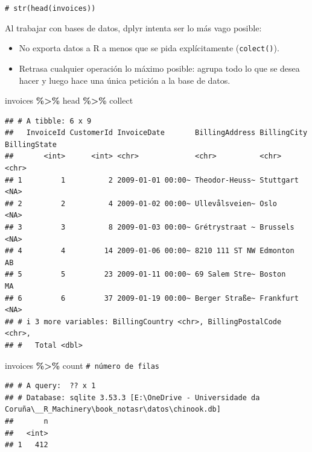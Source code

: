 \documentclass[
]{book}
\newenvironment{Shaded}{\begin{snugshade}}{\end{snugshade}}
\newcommand{\CommentTok}[1]{\textcolor[rgb]{0.56,0.35,0.01}{\textit{#1}}}
\newcommand{\NormalTok}[1]{#1}
\newcommand{\SpecialCharTok}[1]{\textcolor[rgb]{0.81,0.36,0.00}{\textbf{#1}}}
\theoremstyle{break}
\theoremstyle{nonumberplain}
\renewcommand{\CommentTok}[1]{\textcolor[rgb]{0.41,0.41,0.41}{\texttt{#1}}}
\begin{document}
\begin{Shaded}
\begin{Highlighting}[]
\CommentTok{\# str(head(invoices))}
\end{Highlighting}
\end{Shaded}

Al trabajar con bases de datos, dplyr intenta ser lo más vago posible:

\begin{itemize}
\item
  No exporta datos a R a menos que se pida explícitamente (\texttt{colect()}).
\item
  Retrasa cualquier operación lo máximo posible:
  agrupa todo lo que se desea hacer y luego hace una única petición a la base de datos.
\end{itemize}

\begin{Shaded}
\begin{Highlighting}[]
\NormalTok{invoices }\SpecialCharTok{\%\textgreater{}\%}\NormalTok{ head }\SpecialCharTok{\%\textgreater{}\%}\NormalTok{ collect}
\end{Highlighting}
\end{Shaded}

\begin{verbatim}
## # A tibble: 6 x 9
##   InvoiceId CustomerId InvoiceDate       BillingAddress BillingCity BillingState
##       <int>      <int> <chr>             <chr>          <chr>       <chr>       
## 1         1          2 2009-01-01 00:00~ Theodor-Heuss~ Stuttgart   <NA>        
## 2         2          4 2009-01-02 00:00~ Ullevålsveien~ Oslo        <NA>        
## 3         3          8 2009-01-03 00:00~ Grétrystraat ~ Brussels    <NA>        
## 4         4         14 2009-01-06 00:00~ 8210 111 ST NW Edmonton    AB          
## 5         5         23 2009-01-11 00:00~ 69 Salem Stre~ Boston      MA          
## 6         6         37 2009-01-19 00:00~ Berger Straße~ Frankfurt   <NA>        
## # i 3 more variables: BillingCountry <chr>, BillingPostalCode <chr>,
## #   Total <dbl>
\end{verbatim}

\begin{Shaded}
\begin{Highlighting}[]
\NormalTok{invoices }\SpecialCharTok{\%\textgreater{}\%}\NormalTok{ count }\CommentTok{\# número de filas}
\end{Highlighting}
\end{Shaded}

\begin{verbatim}
## # A query:  ?? x 1
## # Database: sqlite 3.53.3 [E:\OneDrive - Universidade da Coruña\__R_Machinery\book_notasr\datos\chinook.db]
##       n
##   <int>
## 1   412
\end{verbatim}
\end{document}
